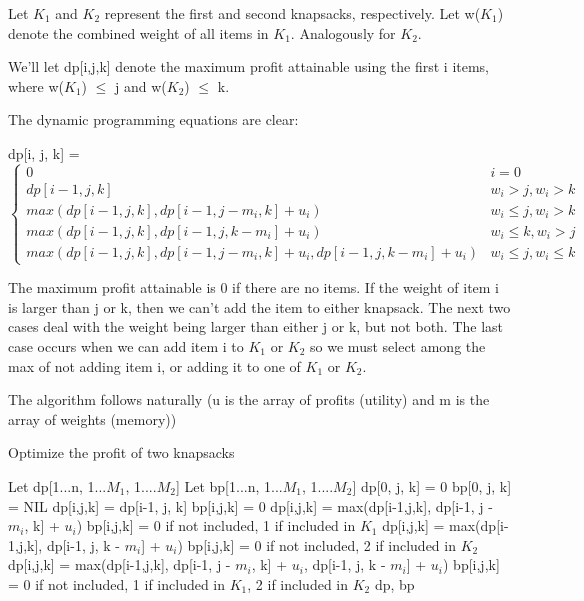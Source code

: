 \documentclass[11pt,a4paper]{article}
\begin{document}
Let $K_{1}$ and $K_{2}$ represent the first and second knapsacks, respectively. Let w($K_{1}$) denote the combined weight of all items in $K_{1}$. Analogously for $K_{2}$. 

We'll let dp[i,j,k] denote the maximum profit attainable using the first i items, where w($K_{1}$) $\leq$ j and w($K_{2}$) $\leq$ k.

The dynamic programming equations are clear:

dp[i, j, k] = 
\[ \begin{cases} 
      0 & i = 0 \\
      dp[i-1, j, k] & w_{i} > j, w_{i} > k\\
      max(dp[i-1,j,k], dp[i-1, j - m_{i}, k] + u_{i}) & w_{i} \leq j, w_{i} > k \\
      max(dp[i-1,j,k], dp[i-1, j, k - m_{i}] + u_{i}) & w_{i} \leq k, w_{i} > j \\
      max(dp[i-1,j,k], dp[i-1, j - m_{i}, k] + u_{i}, dp[i-1, j, k - m_{i}] + u_{i}) & w_{i} \leq j, w_{i} \leq k
   \end{cases}
\]

The maximum profit attainable is 0 if there are no items. If the weight of item i is larger than j or k, then we can't add the item to either knapsack. The next two cases deal with the weight being larger than either j or k, but not both. The last case occurs when we can add item i to $K_{1}$ or $K_{2}$ so we must select among the max of not adding item i, or adding it to one of $K_{1}$ or $K_{2}$. 

The algorithm follows naturally (u is the array of profits (utility) and m is the array of weights (memory)) 

\begin{algorithm}
	\caption{Optimize the profit of two knapsacks}
	\begin{algorithmic}[1]
	\State Let dp[1...n, 1...$M_{1}$, 1....$M_{2}$]
	\State Let bp[1...n, 1...$M_{1}$, 1....$M_{2}$]
			\State dp[0, j, k] = 0
			\State bp[0, j, k] = NIL
		\EndFor
	\EndFor
					\State dp[i,j,k] = dp[i-1, j, k]
					bp[i,j,k] = 0
					\State dp[i,j,k] = max(dp[i-1,j,k], dp[i-1, j - $m_{i}$, k] + $u_{i}$)
					\State bp[i,j,k] = 0 if not included, 1 if included in $K_{1}$
					\State dp[i,j,k] = max(dp[i-1,j,k], dp[i-1, j, k - $m_{i}$] + $u_{i}$)
					\State bp[i,j,k] = 0 if not included, 2 if included in $K_{2}$
				\Else
					\State dp[i,j,k] = max(dp[i-1,j,k], dp[i-1, j - $m_{i}$, k] + $u_{i}$, dp[i-1, j, k - $m_{i}$] + $u_{i}$)
					\State bp[i,j,k] = 0 if not included, 1 if included in $K_{1}$, 2 if included in $K_{2}$
				\EndIf
			\EndFor
		\EndFor
	\EndFor
	\State \Return dp, bp
	\EndFunction
	\end{algorithmic}
	\end{algorithm}
\end{document}
